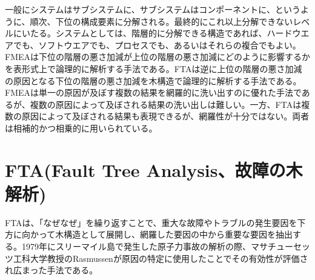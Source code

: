 一般にシステムはサブシステムに、サブシステムはコンポーネントに、というように、順次、下位の構成要素に分解される。最終的にこれ以上分解できないレベルにいたる。システムとしては、階層的に分解できる構造であれば、ハードウエアでも、ソフトウエアでも、プロセスでも、あるいはそれらの複合でもよい。FMEAは下位の階層の悪さ加減が上位の階層の悪さ加減にどのように影響するかを表形式上で論理的に解析する手法である。FTAは逆に上位の階層の悪さ加減の原因となる下位の階層の悪さ加減を木構造で論理的に解析する手法である。FMEAは単一の原因が及ぼす複数の結果を網羅的に洗い出すのに優れた手法であるが、複数の原因によって及ぼされる結果の洗い出しは難しい。一方、FTAは複数の原因によって及ぼされる結果も表現できるが、網羅性が十分ではない。両者は相補的かつ相乗的に用いられている。
\section{FTA(Fault Tree Analysis、故障の木解析)}
FTAは、「なぜなぜ」を繰り返すことで、重大な故障やトラブルの発生要因を下方に向かって木構造として展開し、網羅した要因の中から重要な要因を抽出する。1979年にスリーマイル島で発生した原子力事故の解析の際、マサチューセッツ工科大学教授のRasmussenが原因の特定に使用したことでその有効性が評価され広まった手法である。
